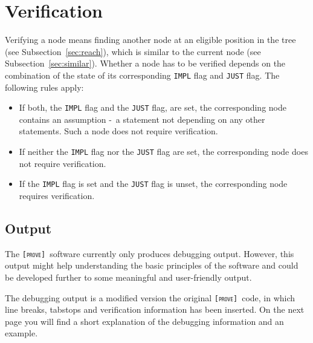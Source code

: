 \documentclass[british]{article}
\newenvironment{code}{\captionsetup{type=listing}}{}
\newcommand\prv{bc}
\newcommand\name{\texttt{\textsc{[prove]}}}
\begin{document}
\pagebreak{}

\section{Verification}\label{sec:verify}

\textcolor{dartmouthgreen}{Verifying a node means finding another node at an
eligible position in the tree (see Subsection~\ref{sec:reach}), which is similar
to the current node (see Subsection~\ref{sec:similar})}.  Whether a node has to
be verified depends on the combination of the state of its corresponding
\texttt{IMPL} flag and \texttt{JUST} flag. The following rules apply:

\begin{itemize}
	\item
		If both, the \texttt{IMPL} flag and the \texttt{JUST} flag, are set, the
		corresponding node contains an assumption -\ a statement not depending
		on any other statements. Such a node does not require verification.
	\item
		If neither the \texttt{IMPL} flag nor the \texttt{JUST} flag are set,
		the corresponding node does not require verification.
	\item
		If the \texttt{IMPL} flag is set and the \texttt{JUST} flag is unset,
		the corresponding node requires verification.
\end{itemize}

\subsection{Output}

The \name\ software currently only produces debugging output. However, this
output might help understanding the basic principles of the software and could
be developed further to some meaningful and user-friendly output.\newline

The debugging output is a modified version the original \name\ code, in which
line breaks, tabstops and verification information has been inserted. On the
next page you will find a short explanation of the debugging information and an
example.

\pagebreak{}

\begin{code}
\label{code:impl1}
\inputminted[linenos]{\prv}{examples/impl1.prove}
\end{code}
\end{document}
